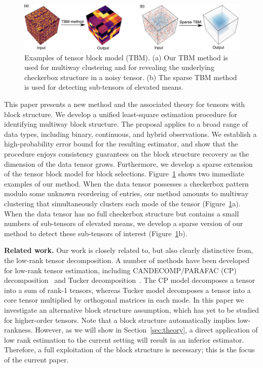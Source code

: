 \documentclass{article}
\begin{document}
\begin{figure}[H]

\centering
\includegraphics[width=.8\textwidth]{demo.pdf}
\caption{\small Examples of tensor block model (TBM). (a) Our TBM method is used for multiway clustering and for revealing the underlying checkerbox structure in a noisy tensor. (b) The sparse TBM method is used for detecting sub-tensors of elevated means. }
\label{fig:1}
\end{figure}

This paper presents a new method and the associated theory for tensors with block structure. We develop a unified least-square estimation procedure for identifying multiway block structure. The proposal applies to a broad range of data types, including binary, continuous, and hybrid observations. We establish a high-probability error bound for the resulting estimator, and show that the procedure enjoys consistency guarantees on the block structure recovery as the dimension of the data tensor grows. Furthermore, we develop a sparse extension of the tensor block model for block selections. Figure~\ref{fig:1} shows two immediate examples of our method. When the data tensor possesses a checkerbox pattern modulo some unknown reordering of entries, our method amounts to multiway clustering that simultaneously clusters each mode of the tensor (Figure~\ref{fig:1}a). When the data tensor has no full checkerbox structure but contains a small numbers of sub-tensors of elevated means, we develop a sparse version of our method to detect these sub-tensors of interest (Figure~\ref{fig:1}b). 

{\bf Related work.} Our work is closely related to, but also clearly distinctive from, the low-rank tensor decomposition. A number of methods have been developed for low-rank tensor estimation, including CANDECOMP/PARAFAC (CP) decomposition~\cite{hitchcock1927expression} and Tucker decomposition~\cite{tucker1966some}. The CP model decomposes a tensor into a sum of rank-1 tensors, whereas Tucker model decomposes a tensor into a core tensor multiplied by orthogonal matrices in each mode. In this paper we investigate an alternative block structure assumption, which has yet to be studied for higher-order tensors. Note that a block structure automatically implies low-rankness. However, as we will show in Section~\ref{sec:theory}, a direct application of low rank estimation to the current setting will result in an inferior estimator. Therefore, a full exploitation of the block structure is necessary; this is the focus of the current paper. 
\end{document}
